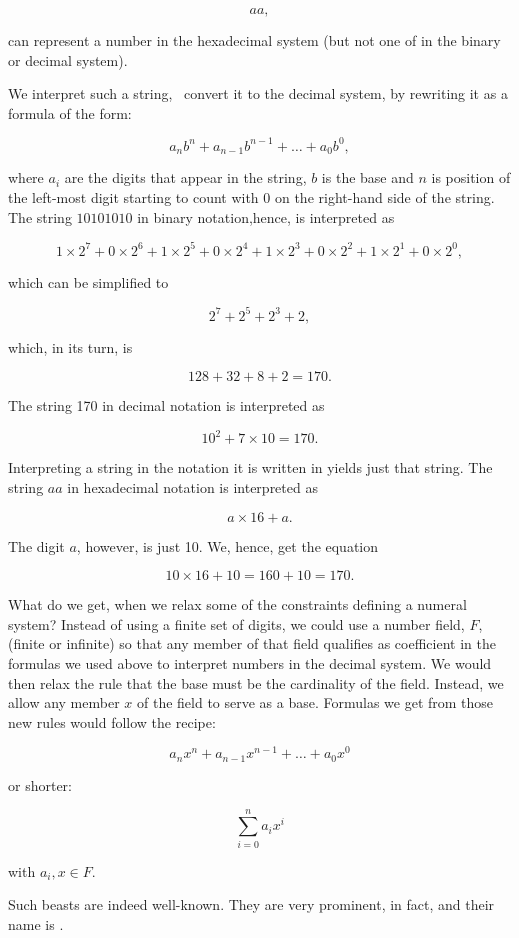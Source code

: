 \documentclass[tikz]{scrreprt}
\begin{document}
\[
aa,
\]

can represent a number in the hexadecimal system
(but not one of in the binary or decimal system).

We interpret such a string, \ie\ convert it
to the decimal system, by rewriting it 
as a formula of the form:

\[
a_nb^n + a_{n-1}b^{n-1} + \dots + a_0b^0,
\]

where $a_i$ are the digits that appear in the string,
$b$ is the base and $n$ is position of the left-most digit
starting to count with 0 on the right-hand side of the string.
The string $10101010$ in binary notation,hence, is interpreted as

\[
1\times 2^7 + 0\times 2^6 + 1\times 2^5 + 0\times 2^4 + 
1\times 2^3 + 0\times 2^2 + 1\times 2^1 + 0\times 2^0,
\]

which can be simplified to

\[
2^7 + 2^5 + 2^3 + 2,
\]

which, in its turn, is

\[
128 + 32 + 8 + 2 = 170.
\]

The string 170 in decimal notation is interpreted as

\[
10^2 + 7\times 10 = 170.
\]

Interpreting a string in the notation it is written in
yields just that string.
The string $aa$ in hexadecimal notation is interpreted as

\[
a\times 16 + a.
\]

The digit $a$, however, is just 10. We, hence, get the equation

\[
10\times 16 + 10 = 160 + 10 = 170.
\]

What do we get, when we relax some of the constraints
defining a numeral system?
Instead of using a finite set of digits,
we could use a number field, $F$, (finite or infinite)
so that any member of that field qualifies as coefficient
in the formulas we used above to interpret numbers
in the decimal system. We would then relax the rule
that the base must be the cardinality of the field.
Instead, we allow any member $x$ of the field 
to serve as a base.
Formulas we get from those new rules would follow the recipe:

\[
a_nx^n + a_{n-1}x^{n-1} + \dots + a_0x^0
\]

or shorter:

\[
\sum_{i=0}^n{a_ix^i}
\]

with $a_i, x \in F$.

Such beasts are indeed well-known. They are very prominent, in fact,
and their name is .
\end{document}
